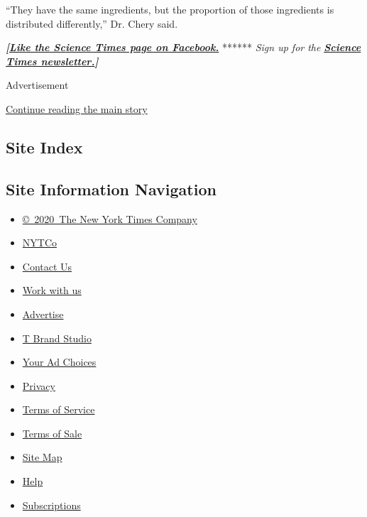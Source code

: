 ``They have the same ingredients, but the proportion of those
ingredients is distributed differently,'' Dr. Chery said.

\textbf{\emph{{[}}\href{http://on.fb.me/1paTQ1h}{\emph{Like the Science
Times page on Facebook.}}} ****** \emph{\textbar{} Sign up for the}
\textbf{\href{http://nyti.ms/1MbHaRU}{\emph{Science Times
newsletter.}}\emph{{]}}}

Advertisement

\protect\hyperlink{after-bottom}{Continue reading the main story}

\hypertarget{site-index}{%
\subsection{Site Index}\label{site-index}}

\hypertarget{site-information-navigation}{%
\subsection{Site Information
Navigation}\label{site-information-navigation}}

\begin{itemize}
\tightlist
\item
  \href{https://help.nytimes.com/hc/en-us/articles/115014792127-Copyright-notice}{©~2020~The
  New York Times Company}
\end{itemize}

\begin{itemize}
\tightlist
\item
  \href{https://www.nytco.com/}{NYTCo}
\item
  \href{https://help.nytimes.com/hc/en-us/articles/115015385887-Contact-Us}{Contact
  Us}
\item
  \href{https://www.nytco.com/careers/}{Work with us}
\item
  \href{https://nytmediakit.com/}{Advertise}
\item
  \href{http://www.tbrandstudio.com/}{T Brand Studio}
\item
  \href{https://www.nytimes.com/privacy/cookie-policy\#how-do-i-manage-trackers}{Your
  Ad Choices}
\item
  \href{https://www.nytimes.com/privacy}{Privacy}
\item
  \href{https://help.nytimes.com/hc/en-us/articles/115014893428-Terms-of-service}{Terms
  of Service}
\item
  \href{https://help.nytimes.com/hc/en-us/articles/115014893968-Terms-of-sale}{Terms
  of Sale}
\item
  \href{https://spiderbites.nytimes.com}{Site Map}
\item
  \href{https://help.nytimes.com/hc/en-us}{Help}
\item
  \href{https://www.nytimes.com/subscription?campaignId=37WXW}{Subscriptions}
\end{itemize}
